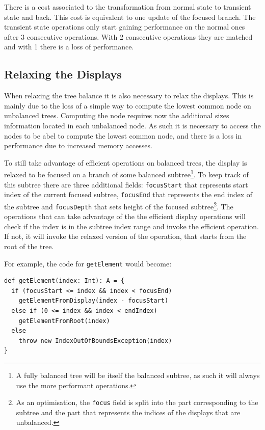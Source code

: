 There is a cost associated to the transformation from normal state to transient state and back. This cost is equivalent to one update of the focused branch. The transient state operations only start gaining performance on the normal ones after 3 consecutive operations. With 2 consecutive operations they are matched and with 1 there is a loss of performance.



\subsection{Relaxing the Displays}
When relaxing the tree balance it is also necessary to relax the displays. This is mainly due to the loss of a simple way to compute the lowest common node on unbalanced trees. Computing the node requires now the additional sizes information located in each unbalanced node. As such it is necessary to access the nodes to be abel to compute the lowest common node, and there is a loss in performance due to increased memory accesses. 

To still take advantage of efficient operations on balanced trees, the display is relaxed to be focused on a branch of some balanced subtree\footnote{A fully balanced tree will be itself the balanced subtree, as such it will always use the more performant operations.}. To keep track of this subtree there are three additional fields: \texttt{focusStart} that represents start index of the current focused subtree, \texttt{focusEnd} that represents the end index of the subtree and \texttt{focusDepth} that sets  height of the focused subtree\footnote{As an optimisation, the \texttt{focus} field is split into the part corresponding to the subtree and the part that represents the indices of the displays that are unbalanced.}. The operations that can take advantage of the the efficient display operations will check if the index is in the subtree index range and invoke the efficient operation. If not, it will invoke the relaxed version of the operation, that starts from the root of the tree.

For example, the code for \texttt{getElement} would become:
\begin{lstlisting}[frame=single]
def getElement(index: Int): A = {
  if (focusStart <= index && index < focusEnd) 
    getElementFromDisplay(index - focusStart)
  else if (0 <= index && index < endIndex) 
    getElementFromRoot(index)    
  else 
    throw new IndexOutOfBoundsException(index)
}
\end{lstlisting}

